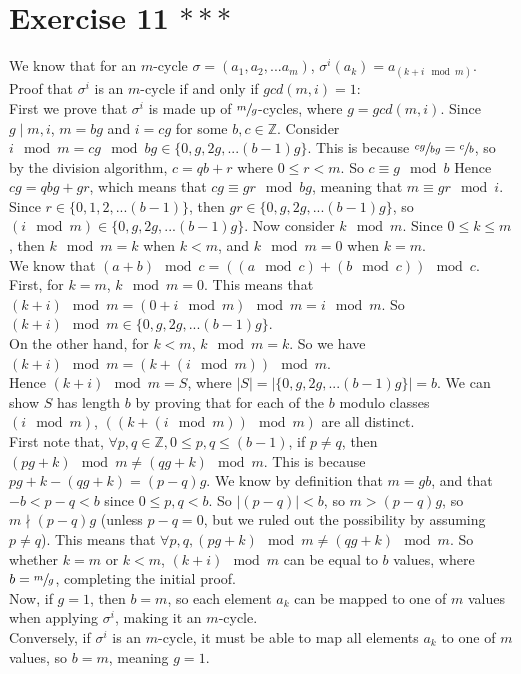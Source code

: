 \documentclass{article}
\newcommand{\Z}{\mathbb{Z}}
\begin{document}
    \section*{Exercise 11 $***$}
    We know that for an $m$-cycle $\sigma = (a_1, a_2, ... a_m)$,
    $\sigma^i(a_k) = a_{(k+i \mod m)}$.
    Proof that $\sigma^i$ is an $m$-cycle
    if and only if $gcd(m, i) = 1$: \\
    First we prove that $\sigma^i$ is made up of $\sfrac{m}{g}$-cycles,
    where $g = gcd(m, i)$.
    Since $g \mid m, i$, $m = bg$ and $i = cg$ for some $b,c \in \Z$.
    Consider $i \mod m = cg \mod bg \in \{0, g, 2g, ... (b-1)g\}$.
    This is because $\sfrac{cg}{bg} = \sfrac{c}{b}$,
    so by the division algorithm, $c = qb + r$
    where $0 \leqslant r < m$.
    So $c \equiv g \mod b$
    Hence $cg = qbg + gr$,
    which means that $cg \equiv gr \mod bg$, 
    meaning that $m \equiv gr \mod i$.
    Since $r \in \{0, 1, 2, ... (b-1)\}$,
    then $gr \in \{0, g, 2g, ... (b-1)g\}$,
    so $(i \mod m) \in \{0, g, 2g, ... (b-1)g\}$.
    Now consider $k \mod m$.
    Since $0 \leqslant k \leqslant m$,
    then $k \mod m = k$ when $k < m$,
    and $k \mod m = 0$ when $k = m$. \\
    We know that $(a + b) \mod c = ((a \mod c )+ (b \mod c)) \mod c$. \\
    First, for $k = m$, $k \mod m = 0$.
    This means that $(k+i) \mod m = (0 + i \mod m) \mod m = i \mod m$.
    So $(k+i) \mod m \in \{0, g, 2g, ... (b-1)g\}$. \\
    On the other hand, for $k < m$, $k \mod m = k$.
    So we have $(k + i) \mod m = (k + (i \mod m)) \mod m$. \\
    Hence $(k + i) \mod m = S$,
    where $|S| = |\{0, g, 2g, ... (b-1)g\}| = b$.
    We can show $S$ has length $b$ by proving that for each of the
    $b$ modulo classes $(i \mod m)$,  
    $((k + (i \mod m)) \mod m)$ are all distinct.  \\
    First note that, $\forall p, q \in \Z, 0 \leqslant p, q \leqslant (b-1)$,
    if $p \neq q$, then $(pg + k) \mod m \neq (qg + k) \mod m$. 
    This is because $pg + k - (qg + k) = (p - q)g$.
    We know by definition that  $m = gb$, and that $-b < p - q < b$
    since $0 \leqslant p, q < b$. So $|(p-q)| < b$,
    so $m > (p - q)g$,
    so $m \nmid (p - q)g$
    (unless $p - q = 0$, but we ruled out the possibility by assuming
    $p \neq q$).
    This means that $\forall p, q, (pg + k) \mod m \neq (qg + k) \mod m$.
    So whether $k = m$ or $k < m$,
    $(k + i) \mod m$ can be equal to $b$ values,
    where $b = \sfrac{m}{g}$, completing the initial proof. \\ 
    Now, if $g = 1$, then $b = m$, so each element $a_k$ can be mapped to
    one of $m$ values when applying $\sigma^i$, making it an $m$-cycle. \\ 
    Conversely, if $\sigma^i$ is an $m$-cycle, it must be able to map all
    elements $a_k$ to one of $m$ values, so $b = m$, meaning $g = 1$. 
\end{document}

